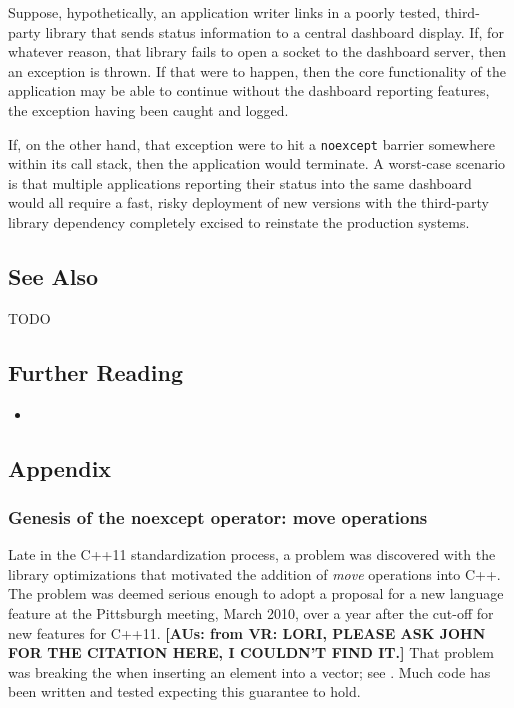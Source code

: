 Suppose, hypothetically, an application writer links in a poorly tested,
third-party library that sends status information to a central dashboard
display. If, for whatever reason, that library fails to open a socket to
the dashboard server, then an exception is thrown. If that were to
happen, then the core functionality of the application may be able to
continue without the dashboard reporting features, the exception having
been caught and logged.

If, on the other hand, that exception were to hit a \lstinline!noexcept!
barrier somewhere within its call stack, then the application would
terminate. A worst-case scenario is that multiple applications reporting
their status into the same dashboard would all require a fast, risky
deployment of new versions with the third-party library dependency
completely excised to reinstate the production systems.

\subsection[See Also]{See Also}\label{see-also}

TODO

\subsection[Further Reading]{Further Reading}\label{further-reading}

\begin{itemize}
\item{\cite{krzemienski11}}
\end{itemize}

\subsection[Appendix]{Appendix}\label{appendix-noexceptoperator}

\subsubsection[Genesis of the \lstinline!noexcept! operator: move operations]{Genesis of the {\SubsubsecCode noexcept} operator: move operations}\label{genesis-of-the-noexcept-operator:-move-operations}

Late in the C++11 standardization process, a problem was discovered with
the library optimizations that motivated the addition of \emph{move}
operations into C++. The problem was deemed serious enough to adopt a
proposal for a new language feature at the Pittsburgh meeting, March
2010, over a year after the cut-off for new features for C++11. \textbf{[AUs: from VR: LORI, 
PLEASE ASK JOHN FOR THE CITATION HERE, I COULDN'T FIND IT.]} That problem
was breaking the  when
inserting an element into a vector; see . Much code has
been written and tested expecting this guarantee to hold.

